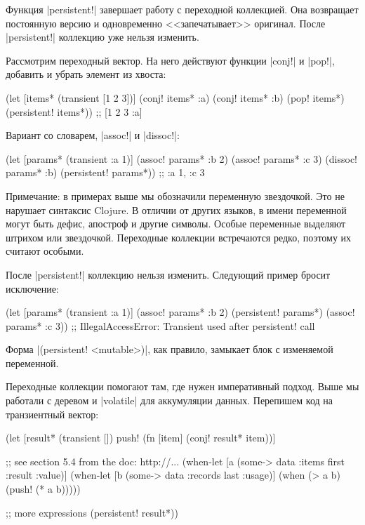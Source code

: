 Функция \spverb|persistent!| завершает работу с переходной коллекцией. Она
возвращает постоянную версию и одновременно <<запечатывает>> оригинал. После
\spverb|persistent!| коллекцию уже нельзя изменить.

Рассмотрим переходный вектор. На него действуют функции \spverb|conj!| и
\spverb|pop!|, добавить и убрать элемент из хвоста:

\begin{english}
  \begin{clojure}
(let [items* (transient [1 2 3])]
  (conj! items* :a)
  (conj! items* :b)
  (pop! items*)
  (persistent! items*))
;; [1 2 3 :a]
  \end{clojure}
\end{english}

\noindent
Вариант со словарем, \spverb|assoc!| и \spverb|dissoc!|:

\begin{english}
  \begin{clojure}
(let [params* (transient {:a 1})]
  (assoc! params* :b 2)
  (assoc! params* :c 3)
  (dissoc! params* :b)
  (persistent! params*))
;; {:a 1, :c 3}
  \end{clojure}
\end{english}

Примечание: в примерах выше мы обозначили переменную звездочкой. Это не нарушает
синтаксис Clojure. В отличии от других языков, в имени переменной могут быть
дефис, апостроф и другие символы. Особые переменные выделяют штрихом или
звездочкой. Переходные коллекции встречаются редко, поэтому их считают особыми.

После \spverb|persistent!| коллекцию нельзя изменить. Следующий пример бросит
исключение:

\begin{english}
  \begin{clojure}
(let [params* (transient {:a 1})]
  (assoc! params* :b 2)
  (persistent! params*)
  (assoc! params* :c 3))
;; IllegalAccessError: Transient used after persistent! call
  \end{clojure}
\end{english}

Форма \spverb|(persistent! <mutable>)|, как правило, замыкает блок с изменяемой
переменной.

Переходные коллекции помогают там, где нужен императивный подход. Выше мы
работали с деревом и \spverb|volatile| для аккумуляции данных. Перепишем код на
транзиентный вектор:

\begin{english}
  \begin{clojure}
(let [result* (transient [])
      push! (fn [item]
              (conj! result* item))]

  ;; see section 5.4 from the doc: http://...
  (when-let [a (some-> data :items first :result :value)]
    (when-let [b (some-> data :records last :usage)]
      (when (> a b)
        (push! (* a b)))))

  ;; more expressions
  (persistent! result*))
  \end{clojure}
\end{english}

